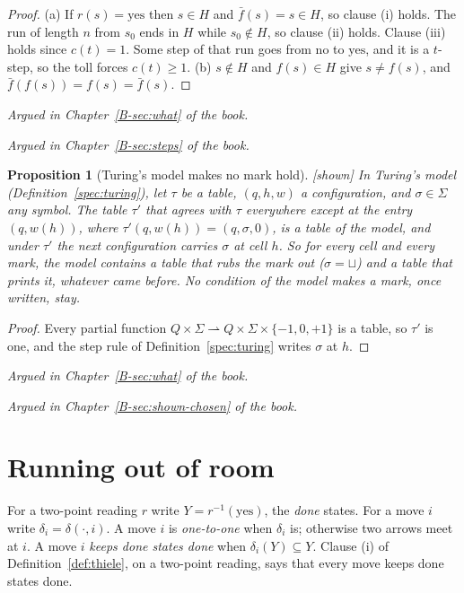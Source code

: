 \documentclass[11pt, a4paper]{article}
\theoremstyle{plain}
\newtheorem{proposition}[theorem]{Proposition}
\theoremstyle{definition}
\theoremstyle{remark}
\newcommand{\step}{\delta}
\newcommand{\cost}{c}
\newcommand{\rd}{r}
\newcommand{\inv}{^{-1}}
\newcommand{\argued}[1]{\par\noindent\textit{Argued in Chapter~\ref{B-#1} of the book.}\par}
\newcommand{\kind}[1]{\textup{[#1]}}
\begin{document}
\begin{proof}
(a) If $\rd(s)=\mathrm{yes}$ then $s\in H$ and $\bar f(s)=s\in H$, so clause (i) holds. The run of
length $n$ from $s_0$ ends in $H$ while $s_0\notin H$, so clause (ii) holds. Clause (iii) holds since
$\cost(t)=1$. Some step of that run goes from $\mathrm{no}$ to $\mathrm{yes}$, and it is a $t$-step, so
the toll forces $\cost(t)\ge1$. (b) $s\notin H$ and $f(s)\in H$ give $s\ne f(s)$, and
$\bar f(f(s))=f(s)=\bar f(s)$.
\end{proof}

\argued{sec:what}
\argued{sec:steps}

\begin{proposition}[Turing's model makes no mark hold]\label{spec:turing-marks} \kind{shown}
In Turing's model (Definition~\ref{spec:turing}), let $\tau$ be a table, $(q,h,w)$ a configuration, and
$\sigma\in\Sigma$ any symbol. The table $\tau'$ that agrees with $\tau$ everywhere except at the entry
$(q,w(h))$, where $\tau'(q,w(h))=(q,\sigma,0)$, is a table of the model, and under $\tau'$ the next
configuration carries $\sigma$ at cell $h$. So for every cell and every mark, the model contains a
table that rubs the mark out ($\sigma=\sqcup$) and a table that prints it, whatever came before. No
condition of the model makes a mark, once written, stay.
\end{proposition}

\begin{proof}
Every partial function $Q\times\Sigma\rightharpoonup Q\times\Sigma\times\{-1,0,+1\}$ is a table, so
$\tau'$ is one, and the step rule of Definition~\ref{spec:turing} writes $\sigma$ at $h$.
\end{proof}

\argued{sec:what}
\argued{sec:shown-chosen}

\section{Running out of room}\label{spec:ch02}

For a two-point reading $\rd$ write $Y=\rd\inv(\mathrm{yes})$, the \emph{done} states. For a move $i$
write $\step_i=\step(\cdot,i)$. A move $i$ is \emph{one-to-one} when $\step_i$ is; otherwise two arrows
meet at $i$. A move $i$ \emph{keeps done states done} when $\step_i(Y)\subseteq Y$. Clause (i) of
Definition~\ref{def:thiele}, on a two-point reading, says that every move keeps done states done.
\end{document}
